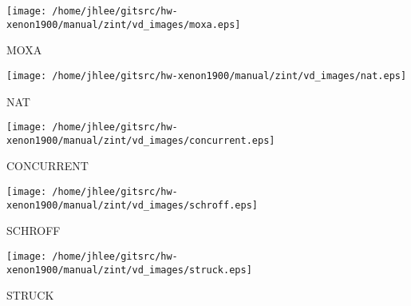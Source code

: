 \noindent
\vspace{1cm}
\begin{minipage}{.2\textwidth}
\begin{center}
\texttt{[image: /home/jhlee/gitsrc/hw-xenon1900/manual/zint/vd\_images/moxa.eps]}
\end{center}
\end{minipage}
\begin{minipage}{.7\textwidth}
MOXA
\end{minipage}


\noindent
\vspace{1cm}
\begin{minipage}{.2\textwidth}
\begin{center}
\texttt{[image: /home/jhlee/gitsrc/hw-xenon1900/manual/zint/vd\_images/nat.eps]}
\end{center}
\end{minipage}
\begin{minipage}{.7\textwidth}
NAT
\end{minipage}


\noindent
\vspace{1cm}
\begin{minipage}{.2\textwidth}
\begin{center}
\texttt{[image: /home/jhlee/gitsrc/hw-xenon1900/manual/zint/vd\_images/concurrent.eps]}
\end{center}
\end{minipage}
\begin{minipage}{.7\textwidth}
CONCURRENT
\end{minipage}


\noindent
\vspace{1cm}
\begin{minipage}{.2\textwidth}
\begin{center}
\texttt{[image: /home/jhlee/gitsrc/hw-xenon1900/manual/zint/vd\_images/schroff.eps]}
\end{center}
\end{minipage}
\begin{minipage}{.7\textwidth}
SCHROFF
\end{minipage}


\noindent
\vspace{1cm}
\begin{minipage}{.2\textwidth}
\begin{center}
\texttt{[image: /home/jhlee/gitsrc/hw-xenon1900/manual/zint/vd\_images/struck.eps]}
\end{center}
\end{minipage}
\begin{minipage}{.7\textwidth}
STRUCK
\end{minipage}


